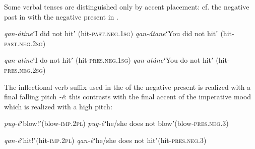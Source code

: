\documentclass[output=paper,modfonts,nonflat,hidelinks]{langsci/langscibook}
\begin{document}
Some verbal tenses are distinguished only by accent placement: cf. the negative past in  with the negative present in . 

\begin{exe}
\ex \begin{xlist}
\ex \textit{qan-átine}\hspace{8mm}ʻI did not hitʼ (hit-\textsc{past}.\textsc{neg}.1\textsc{sg}) 
\ex \textit{qan-átane}\hspace{8mm}ʻYou did not hitʼ (hit-\textsc{past}.\textsc{neg}.2\textsc{sg})
\end{xlist}\label{ex:Petrollino:NEGPast}
\end{exe} 

\begin{exe}
\ex \begin{xlist}
\ex \textit{qan-atíne}\hspace{8mm}ʻI do not hitʼ (hit-\textsc{pres}.\textsc{neg}.1\textsc{sg}) 
\ex \textit{qan-atáne}\hspace{8mm}ʻYou do not hitʼ (hit-\textsc{pres}.\textsc{neg}.2\textsc{sg}) 
\end{xlist}\label{ex:Petrollino:NEGPres}
\end{exe} 

The inflectional verb suffix used in the  of the negative present is realized with a final falling pitch \textit{-ê}: this contrasts with the final accent of the imperative mood which is realized with a high pitch:

\begin{exe}
\ex \begin{xlist} \label{ex:Petrollino:IMPNEG}
\ex \textit{pug-é}\hspace{15mm}ʻblow!ʼ\hspace{40mm}(blow-\textsc{imp}.2\textsc{pl})
\ex \textit{pug-ê}\hspace{15mm}ʻhe/she does not blowʼ\hspace{16mm}(blow-\textsc{pres}.\textsc{neg}.3)
\end{xlist}
\end{exe}

\begin{exe}
\ex \begin{xlist}
\ex \textit{qan-é}\hspace{15mm}ʻhit!ʼ\hspace{44mm}(hit-\textsc{imp}.2\textsc{pl})
\ex \textit{qan-ê}\hspace{15mm}ʻhe/she does not hitʼ\hspace{20mm}(hit-\textsc{pres}.\textsc{neg}.3)
\end{xlist}
\end{exe}
\end{document}
